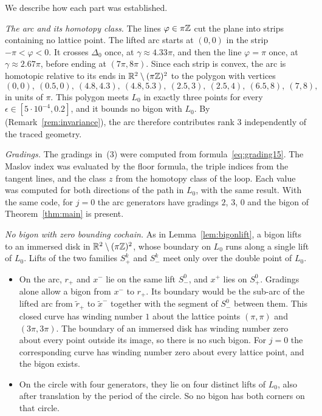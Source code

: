 We describe how each part was established.

\emph{The arc and its homotopy class.} The lines $\varphi\in\pi\mathbb{Z}$ cut the plane into strips containing no lattice
point. The lifted arc starts at $(0,0)$ in the strip $-\pi<\varphi<0$. It crosses $\Delta_0$ once, at $\gamma\approx4.33\pi$, and
then the line $\varphi=\pi$ once, at $\gamma\approx2.67\pi$, before ending at $(7\pi,8\pi)$. Since each strip is convex, the arc is
homotopic relative to its ends in $\mathbb{R}^2\setminus(\pi\mathbb{Z})^2$ to the polygon with vertices
\[
(0,0),\ (0.5,0),\ (4.8,4.3),\ (4.8,5.3),\ (2.5,3),\ (2.5,4),\ (6.5,8),\ (7,8),
\]
in units of $\pi$. This polygon meets $L_0$ in exactly three points for every $\epsilon\in[5\cdot10^{-4},0.2]$, and it
bounds no bigon with $L_0$. By~\cite[Thm.~4.1]{HHK2} (Remark~\ref{rem:invariance}), the arc therefore contributes rank $3$
independently of the traced geometry.

\emph{Gradings.} The gradings in~(3) were computed from formula~\eqref{eq:grading15}. The Maslov index was
evaluated by the floor formula, the triple indices from the tangent lines, and the class $z$ from the
homotopy class of the loop. Each value was computed for both directions of the path in $L_0$, with the same
result. With the same code, for $j=0$ the arc generators have gradings $2$, $3$, $0$ and the bigon of
Theorem~\ref{thm:main} is present.

\emph{No bigon with zero bounding cochain.} As in Lemma~\ref{lem:bigonlift}, a bigon lifts to an immersed disk in
$\mathbb{R}^2\setminus(\pi\mathbb{Z})^2$, whose boundary on $L_0$ runs along a single lift of $L_0$. Lifts of the two families
$S_+^k$ and $S_-^k$ meet only over the double point of $L_0$.
\begin{itemize}
\item On the arc, $r_+$ and $x^-$ lie on the same lift $S_-^0$, and $x^+$ lies on $S_+^0$. Gradings alone allow a
bigon from $x^-$ to $r_+$. Its boundary would be the sub-arc of the lifted arc from $\tilde r_+$ to $\tilde x^-$
together with the segment of $S_-^0$ between them. This closed curve has winding number $1$ about the lattice
points $(\pi,\pi)$ and $(3\pi,3\pi)$. The boundary of an immersed disk has winding number zero about every
point outside its image, so there is no such bigon. For $j=0$ the corresponding curve has winding number
zero about every lattice point, and the bigon exists.
\item On the circle with four generators, they lie on four distinct lifts of $L_0$, also after translation by the
period of the circle. So no bigon has both corners on that circle.
\end{itemize}

